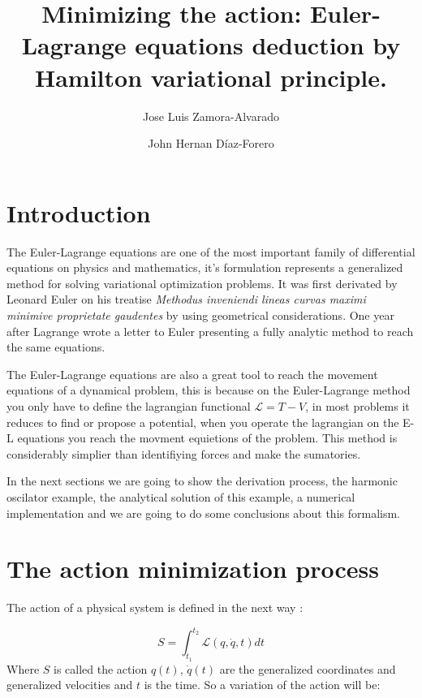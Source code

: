 \documentclass[9pt,a4paper,twocolumn,twoside]{rho-class/rho}
\title{Minimizing the action: Euler-Lagrange equations deduction by Hamilton variational principle.}
\author[{\textasteriskcentered},a,1]{Jose Luis Zamora-Alvarado}
\author[{\textdagger},a,2]{John Hernan Díaz-Forero}
\affil[a]{Universidad Distrital Francisco José de Caldas.}
\begin{document}
    \maketitle
    \thispagestyle{firststyle}



\section{Introduction}

The Euler-Lagrange equations are one of the most important family of differential equations on physics and mathematics, it's formulation represents a generalized method for solving variational optimization problems. It was first derivated by Leonard Euler on his treatise \textit{Methodus inveniendi lineas curvas maximi minimive proprietate gaudentes} by using geometrical considerations\cite{Euler-1744}. One year after Lagrange wrote a letter to Euler presenting a fully analytic method to reach the same equations\cite{Euler-Lagrange_letters}.

The Euler-Lagrange equations are also a great tool to reach the movement equations of a dynamical problem, this is because on the Euler-Lagrange method you only have to define the lagrangian functional $\mathcal{L} = T - V$, in most problems it reduces to find or propose a potential, when you operate the lagrangian on the E-L equations you reach the movment equietions of the problem. This method is considerably simplier than identifiying forces and make the sumatories.


In the next sections we are going to show the derivation process, the harmonic oscilator example, the analytical solution of this example, a numerical implementation and we are going to do some conclusions about this formalism.

\section{The action minimization process}

The action of a physical system is defined in the next way \cite{Landau}:

\begin{equation}
    S = \int_{t_1}^{t_2} \mathcal{L}(q,\dot{q},t)dt  
\end{equation}
Where $S$ is called the action $q(t)$, $\dot{q}(t)$ are the generalized coordinates and generalized velocities and $t$ is the time. So a variation of the action will be:
\end{document}
